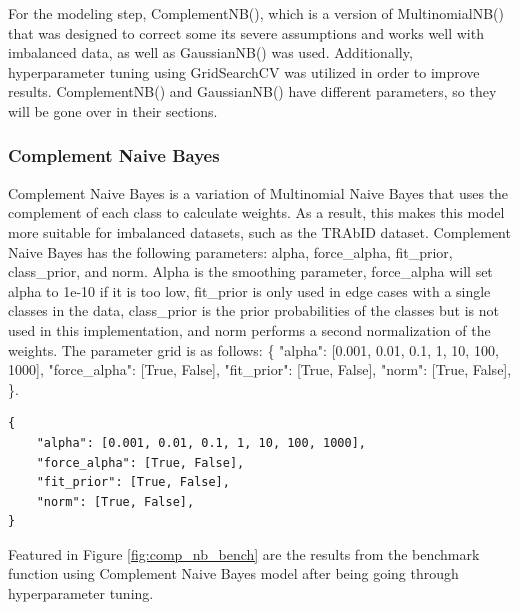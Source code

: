 For the modeling step, ComplementNB(), which is a version of MultinomialNB() that was designed to correct some its severe assumptions and works well with imbalanced data, as well as GaussianNB() was used. Additionally, hyperparameter tuning using GridSearchCV was utilized in order to improve results. ComplementNB() and GaussianNB() have different parameters, so they will be gone over in their sections.

\subsubsection{Complement Naive Bayes}
Complement Naive Bayes is a variation of Multinomial Naive Bayes that uses the complement of each class to calculate weights. As a result, this makes this model more suitable for imbalanced datasets, such as the TRAbID dataset. Complement Naive Bayes has the following parameters: alpha, force\_alpha, fit\_prior, class\_prior, and norm. Alpha is the smoothing parameter, force\_alpha will set alpha to 1e-10 if it is too low, fit\_prior is only used in edge cases with a single classes in the data, class\_prior is the prior probabilities of the classes but is not used in this implementation, and norm performs a second normalization of the weights. The parameter grid is as follows: 
 \{
     "alpha": [0.001, 0.01, 0.1, 1, 10, 100, 1000],
     "force\_alpha": [True, False],
     "fit\_prior": [True, False],
     "norm": [True, False],
 \}.

\begin{lstlisting}
{
    "alpha": [0.001, 0.01, 0.1, 1, 10, 100, 1000],
    "force_alpha": [True, False],
    "fit_prior": [True, False],
    "norm": [True, False],
}
\end{lstlisting}

Featured in Figure \ref{fig:comp_nb_bench} are the results from the benchmark function using Complement Naive Bayes model after being going through hyperparameter tuning.

